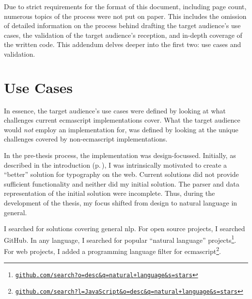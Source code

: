
\begingroup
\let\clearpage\relax
\let\cleardoublepage\relax
\let\cleardoublepage\relax

\manualmark
{}

\noindent Due to strict requirements for the format of this document,
  including page count, numerous topics of the process were not put on paper.
This includes the omission of detailed information on the process behind
  drafting the target audience's use cases, the validation of the
  target audience's reception, and in-depth coverage of the written code.
This addendum delves deeper into the first two: use cases and validation.

\chapter*{Use Cases}\label{addendum-use-cases}

In essence, the target audience's use cases were defined by looking at what
  challenges current \gls{ecmascript} implementations cover.
What the target audience would \emph{not} employ an implementation for, was
  defined by looking at the unique challenges covered by non-\gls{ecmascript}
  implementations.

In the pre-thesis process, the implementation was design-focussed.
Initially, as described in the introduction (p.\,\pageref{introduction}), I
  was intrinsically motivated to create a ``better'' solution for typography
  on the web.
Current solutions did not provide sufficient functionality and neither did my
  initial solution.
The parser and data representation of the initial solution were incomplete.
Thus, during the development of the thesis, my focus shifted from design to
  natural language in general.

I searched for solutions covering general \gls{nlp}.
For open source projects, I searched GitHub.
In any language, I searched for popular ``natural language''
  projects\footnote{
    \href{https://github.com/search?o=desc&q=natural+language&s=stars}{\nolinkurl{github.com/search?o=desc&q=natural+language&s=stars}}
  }.
For web projects, I added a programming language filter for
  \gls{ecmascript}\footnote{
    \href{https://github.com/search?l=JavaScript&o=desc&q=natural+language&s=stars}{\nolinkurl{github.com/search?l=JavaScript&o=desc&q=natural+language&s=stars}}
  }.

